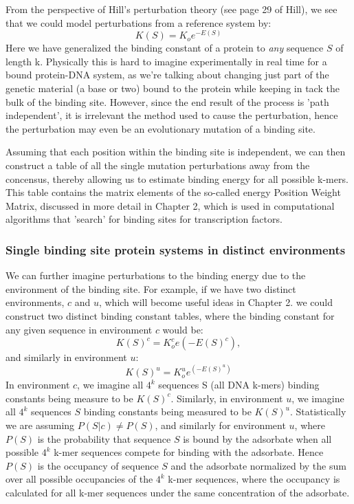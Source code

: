   From the perspective of Hill's perturbation theory (see page 29 of Hill\cite{hill}), we see that we could model perturbations from a reference system by:
\begin{equation}\label{}
  K(S) =K_o e^{-E(S)}
\end{equation}
Here we have generalized the binding constant of a protein to \textit{any} sequence $S$ of length k.  Physically this is hard to imagine experimentally in real time for a bound protein-DNA system, as we're talking about changing just part of the genetic material (a base or two) bound to the protein while keeping in tack the bulk of the binding site.  However, since the end result of the process is 'path independent', it is irrelevant the method used to cause the perturbation, hence the perturbation may even be an evolutionary mutation of a binding site.

Assuming that each position within the binding site is independent, we can then construct a table of all the single mutation perturbations away from the concensus, thereby allowing us to estimate binding energy for all possible k-mers.  This table contains the matrix elements of the so-called energy Position Weight Matrix, discussed in more detail in Chapter 2, which is used in computational algorithms that 'search' for binding sites for transcription factors.
\subsubsection{Single binding site protein systems in distinct environments}
We can further imagine perturbations to the binding energy due to the environment of the binding site.  For example, if we have two distinct environments, $c$ and $u$, which will become useful ideas in Chapter 2. we could construct two distinct binding constant tables, where the binding constant for any given sequence in environment $c$ would be:
\begin{equation}\label{}
  K(S)^c =K_o^c e{(-E(S)^c)},
\end{equation}
and similarly in environment $u$:
\begin{equation}\label{}
  K(S)^u=K_o^u e^{(-E(S)^u)}
\end{equation}
In environment $c$, we imagine all $4^k$ sequences S (all DNA k-mers) binding constants being measure to be $ K(S)^c$.  Similarly, in environment $u$, we imagine all $4^k$ sequences $S$ binding constants being measured to be $ K(S)^u$.  Statistically we are  assuming $P(S|c)\neq P(S)$, and similarly for environment $u$, where $P(S)$ is the probability that sequence $S$ is bound by the adsorbate when all possible $4^k$ k-mer sequences compete for binding with the adsorbate.  Hence $P(S)$ is the occupancy of sequence $S$ and the adsorbate normalized by the sum over all possible occupancies of the $4^k$ k-mer sequences, where the occupancy is calculated for all k-mer sequences under the same concentration of the adsorbate.

